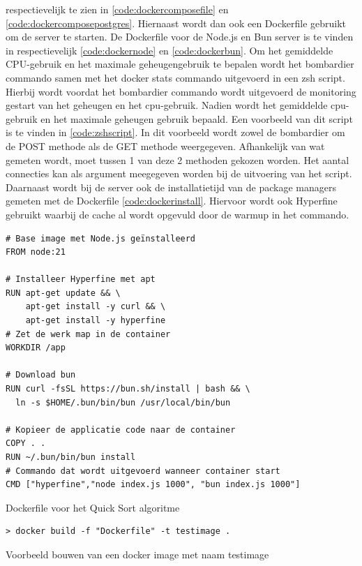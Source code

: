 respectievelijk te zien in \ref{code:dockercomposefile} en \ref{code:dockercomposepostgres}.
Hiernaast wordt dan ook een Dockerfile gebruikt om de server te starten. De Dockerfile voor de Node.js en Bun server is te vinden in
respectievelijk \ref{code:dockernode} en \ref{code:dockerbun}. 
Om het gemiddelde CPU-gebruik en het maximale geheugengebruik te bepalen wordt het bombardier commando samen met het docker stats commando uitgevoerd in een zsh script.
Hierbij wordt voordat het bombardier commando wordt uitgevoerd de monitoring gestart van het geheugen en het cpu-gebruik. Nadien wordt het gemiddelde cpu-gebruik en het maximale geheugen gebruik bepaald.
Een voorbeeld van dit script  is te vinden in \ref{code:zshscript}. 
In dit voorbeeld wordt zowel de bombardier om de POST methode als de GET methode weergegeven. Afhankelijk van wat gemeten wordt, moet tussen 1 van deze 2 methoden gekozen worden.
Het aantal connecties kan als argument meegegeven worden bij de uitvoering van het script.
Daarnaast wordt bij de server ook de installatietijd van de package managers gemeten met de Dockerfile \ref{code:dockerinstall}.
Hiervoor wordt ook Hyperfine gebruikt waarbij de cache al wordt opgevuld door de warmup in het commando.
\begin{listing}[H]
  \centering
  \begin{verbatim}
# Base image met Node.js geïnstalleerd
FROM node:21

# Installeer Hyperfine met apt
RUN apt-get update && \
    apt-get install -y curl && \
    apt-get install -y hyperfine
# Zet de werk map in de container
WORKDIR /app

# Download bun
RUN curl -fsSL https://bun.sh/install | bash && \
  ln -s $HOME/.bun/bin/bun /usr/local/bin/bun

# Kopieer de applicatie code naar de container
COPY . .
RUN ~/.bun/bin/bun install
# Commando dat wordt uitgevoerd wanneer container start
CMD ["hyperfine","node index.js 1000", "bun index.js 1000"]
      \end{verbatim}
      \caption{\label{code:dockerscript}Dockerfile voor het Quick Sort algoritme}
\end{listing}
\begin{listing}[H]
  \centering
  \begin{verbatim}
> docker build -f "Dockerfile" -t testimage .
      \end{verbatim}
      \caption{\label{code:dockerbuild}Voorbeeld bouwen van een docker image met naam testimage}
\end{listing}
